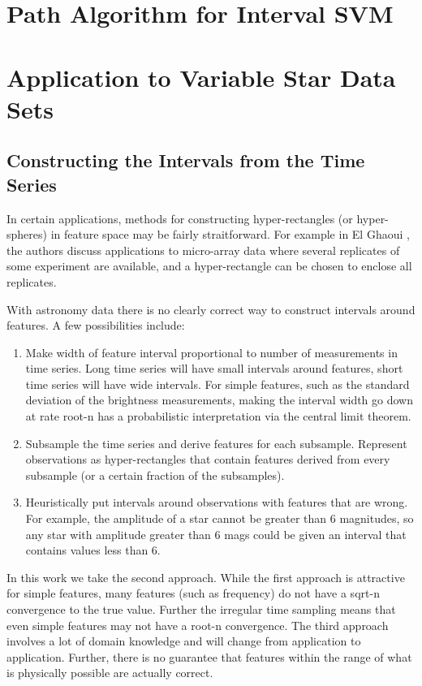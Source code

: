 \documentclass[11pt]{article}
\begin{document}
\section{Path Algorithm for Interval SVM}

\section{Application to Variable Star Data Sets}
\subsection{Constructing the Intervals from the Time Series}
In certain applications, methods for constructing hyper-rectangles (or hyper-spheres) in feature space may be fairly straitforward. For example in El Ghaoui \cite{el2003robust}, the authors discuss applications to micro-array data where several replicates of some experiment are available, and a hyper-rectangle can be chosen to enclose all replicates.

With astronomy data there is no clearly correct way to construct intervals around features. A few possibilities include:
\begin{enumerate}
\item Make width of feature interval proportional to number of measurements in time series. Long time series will have small intervals around features, short time series will have wide intervals. For simple features, such as the standard deviation of the brightness measurements, making the interval width go down at rate root-n has a probabilistic interpretation via the central limit theorem.
\item Subsample the time series and derive features for each subsample. Represent observations as hyper-rectangles that contain features derived from every subsample (or a certain fraction of the subsamples).
\item Heuristically put intervals around observations with features that are wrong. For example, the amplitude of a star cannot be greater than 6 magnitudes, so any star with amplitude greater than 6 mags could be given an interval that contains values less than 6.
\end{enumerate}
In this work we take the second approach. While the first approach is attractive for simple features, many features (such as frequency) do not have a sqrt-n convergence to the true value. Further the irregular time sampling means that even simple features may not have a root-n convergence. The third approach involves a lot of domain knowledge and will change from application to application. Further, there is no guarantee that features within the range of what is physically possible are actually correct.
\end{document}

